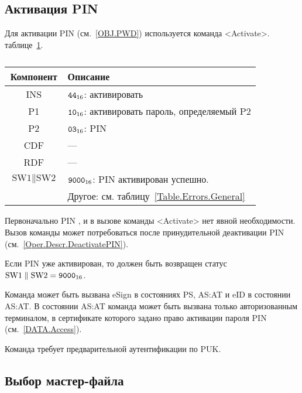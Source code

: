 \subsection{Активация PIN}\label{Oper.Descr.ActivatePIN}

Для активации PIN (см.~\ref{OBJ.PWD})  используется команда <Activate>.
 таблице~\ref{Table.Oper.ActivatePINCmd}.

\begin{table}[hbt]
\caption{}\label{Table.Oper.ActivatePINCmd}
\begin{tabular}{|c|p{14cm}|}
\hline
Компонент & Описание\\
\hline
\hline
INS & $\texttt{44}_{16}$: активировать\\
\hline
P1 & $\texttt{10}_{16}$: активировать пароль, определяемый P2\\
\hline
P2 & $\texttt{03}_{16}$: PIN \\
\hline
CDF &  ---  \\
\hline 
RDF &  --- \\
\hline
$\text{SW1} \parallel \text{SW2}$ & 
  $\texttt{9000}_{16}$:  PIN активирован успешно.\\
  & Другое: см. таблицу~\ref{Table.Errors.General}\\
\hline
\end{tabular}
\end{table}

Первоначально PIN , и в вызове команды <Activate> 
нет явной необходимости. Вызов команды может потребоваться после 
принудительной деактивации PIN (см.~\ref{Oper.Descr.DeactivatePIN}). 

Если PIN уже активирован, то должен быть возвращен 
статус $\text{SW1} \parallel \text{SW2} = \texttt{9000}_{16}$.

Команда может быть вызвана  eSign 
в состояниях PS, AS:AT и  eID в состоянии 
AS:AT. В состоянии AS:AT команда может быть вызвана 
только авторизованным терминалом, в сертификате которого задано 
право активации пароля PIN (см.~\ref{DATA.Access}).

Команда требует предварительной аутентификации по PUK.

\subsection{Выбор мастер-файла}
\label{Oper.Descr.SelectMF}

